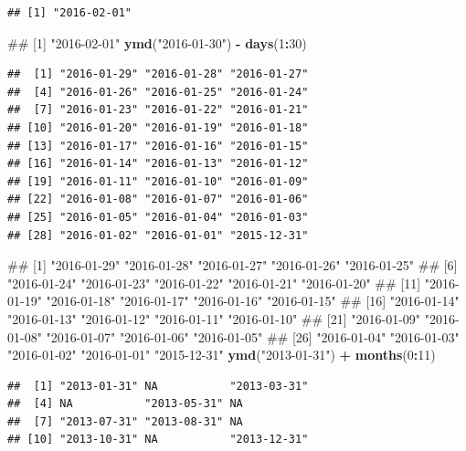 \documentclass[10pt,]{krantz}
\makeatletter
\newenvironment{Shaded}{\begin{snugshade}}{\end{snugshade}}
\newcommand{\KeywordTok}[1]{\textcolor[rgb]{0.13,0.29,0.53}{\textbf{#1}}}
\newcommand{\DecValTok}[1]{\textcolor[rgb]{0.00,0.00,0.81}{#1}}
\newcommand{\StringTok}[1]{\textcolor[rgb]{0.31,0.60,0.02}{#1}}
\newcommand{\OperatorTok}[1]{\textcolor[rgb]{0.81,0.36,0.00}{\textbf{#1}}}
\newcommand{\NormalTok}[1]{#1}
\newenvironment{kframe}{%
\medskip{}
\setlength{\fboxsep}{.8em}
 \def\at@end@of@kframe{}%
 \ifinner\ifhmode%
  \def\at@end@of@kframe{\end{minipage}}%
  \begin{minipage}{\columnwidth}%
 \fi\fi%
 \def\FrameCommand##1{\hskip\@totalleftmargin \hskip-\fboxsep
 \colorbox{shadecolor}{##1}\hskip-\fboxsep
     \hskip-\linewidth \hskip-\@totalleftmargin \hskip\columnwidth}%
 \MakeFramed {\advance\hsize-\width
   \@totalleftmargin\z@ \linewidth\hsize
   \@setminipage}}%
 {\par\unskip\endMakeFramed%
 \at@end@of@kframe}
\renewenvironment{Shaded}{\begin{kframe}}{\end{kframe}}
\makeatother
\begin{document}
\begin{verbatim}
## [1] "2016-02-01"
\end{verbatim}

\begin{Shaded}
\begin{Highlighting}[]
\NormalTok{## [1] "2016-02-01"}
\KeywordTok{ymd}\NormalTok{(}\StringTok{"2016-01-30"}\NormalTok{) }\OperatorTok{-}\StringTok{ }\KeywordTok{days}\NormalTok{(}\DecValTok{1}\OperatorTok{:}\DecValTok{30}\NormalTok{)}
\end{Highlighting}
\end{Shaded}

\begin{verbatim}
##  [1] "2016-01-29" "2016-01-28" "2016-01-27"
##  [4] "2016-01-26" "2016-01-25" "2016-01-24"
##  [7] "2016-01-23" "2016-01-22" "2016-01-21"
## [10] "2016-01-20" "2016-01-19" "2016-01-18"
## [13] "2016-01-17" "2016-01-16" "2016-01-15"
## [16] "2016-01-14" "2016-01-13" "2016-01-12"
## [19] "2016-01-11" "2016-01-10" "2016-01-09"
## [22] "2016-01-08" "2016-01-07" "2016-01-06"
## [25] "2016-01-05" "2016-01-04" "2016-01-03"
## [28] "2016-01-02" "2016-01-01" "2015-12-31"
\end{verbatim}

\begin{Shaded}
\begin{Highlighting}[]
\NormalTok{##  [1] "2016-01-29" "2016-01-28" "2016-01-27" "2016-01-26" "2016-01-25"}
\NormalTok{##  [6] "2016-01-24" "2016-01-23" "2016-01-22" "2016-01-21" "2016-01-20"}
\NormalTok{## [11] "2016-01-19" "2016-01-18" "2016-01-17" "2016-01-16" "2016-01-15"}
\NormalTok{## [16] "2016-01-14" "2016-01-13" "2016-01-12" "2016-01-11" "2016-01-10"}
\NormalTok{## [21] "2016-01-09" "2016-01-08" "2016-01-07" "2016-01-06" "2016-01-05"}
\NormalTok{## [26] "2016-01-04" "2016-01-03" "2016-01-02" "2016-01-01" "2015-12-31"}
\KeywordTok{ymd}\NormalTok{(}\StringTok{"2013-01-31"}\NormalTok{) }\OperatorTok{+}\StringTok{ }\KeywordTok{months}\NormalTok{(}\DecValTok{0}\OperatorTok{:}\DecValTok{11}\NormalTok{)}
\end{Highlighting}
\end{Shaded}

\begin{verbatim}
##  [1] "2013-01-31" NA           "2013-03-31"
##  [4] NA           "2013-05-31" NA          
##  [7] "2013-07-31" "2013-08-31" NA          
## [10] "2013-10-31" NA           "2013-12-31"
\end{verbatim}
\end{document}
